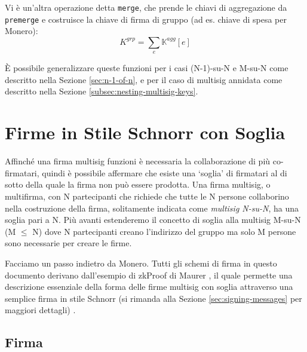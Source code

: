 Vi è un'altra operazione detta {\tt merge}, che prende le chiavi di aggregazione da {\tt premerge} e costruisce la chiave di firma di gruppo (ad es. chiave di spesa per Monero)\vspace{.175cm}:
\[K^{grp} = \sum_e \mathbb{K}^{agg}[e]\]

È possibile generalizzare queste funzioni per i casi (N-1)-su-N e M-su-N come descritto nella Sezione \ref{sec:n-1-of-n}, e per il caso di multisig annidata come descritto nella Sezione \ref{subsec:nesting-multisig-keys}.



\section{Firme in Stile Schnorr con Soglia}
\label{sec:threshold-schnorr}

Affinché una firma multisig funzioni è necessaria la collaborazione di più co-firmatari, quindi è possibile affermare che esiste una `soglia' di firmatari al di sotto della quale la firma non può essere prodotta. Una firma multisig, o multifirma, con N partecipanti che richiede che tutte le N persone collaborino nella costruzione della firma, solitamente indicata come \emph{multisig N-su-N}, ha una soglia pari a N. Più avanti estenderemo il concetto di soglia alla multisig M-su-N (M $\leq$ N) dove N partecipanti creano l'indirizzo del gruppo ma solo M persone sono necessarie per creare le firme.

Facciamo un passo indietro da Monero. Tutti gli schemi di firma in questo documento derivano dall'esempio di zkProof di Maurer \cite{simple-zk-proof-maurer}, il quale permette una descrizione essenziale della forma delle firme multisig con soglia attraverso una semplice firma in stile Schnorr (si rimanda alla Sezione \ref{sec:signing-messages} per maggiori dettagli) \cite{old-multisig-mrl-note}.


\subsection*{Firma}

